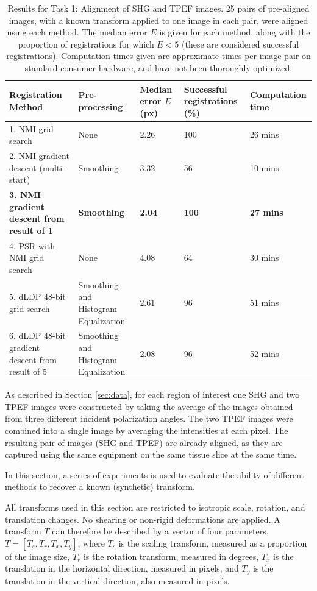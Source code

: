 \documentclass{report}
\begin{document}
\begin{table}
\centering
\begin{tabular}{|p{1.2in}|p{1.05in}|p{0.6in}|p{0.9in}|p{0.9in}|}
\hline
\textbf{Registration Method} & \textbf{Pre-processing} & \textbf{Median error $E$ (px)} & \textbf{Successful registrations (\%)} & \textbf{Computation time} \\
\hline
\hline
1. NMI grid search & None & 2.26 & 100 & 26 mins \\
\hline
2. NMI gradient descent (multi-start) & Smoothing & 3.32  & 56 & 10 mins \\
\hline
\textbf{3. NMI gradient descent from result of 1} & \textbf{Smoothing} & \textbf{2.04}  & \textbf{100} & \textbf{27 mins} \\ 
\hline
4. PSR with NMI grid search & None & 4.08 & 64 & 30 mins \\
\hline
5. dLDP 48-bit grid search & Smoothing and Histogram Equalization & 2.61 & 96 & 51 mins \\
\hline
6. dLDP 48-bit gradient descent from result of 5 & Smoothing and Histogram Equalization & 2.08  & 96 & 52 mins \\
\hline
\end{tabular}
\caption{Results for Task 1: Alignment of SHG and TPEF images. 25 pairs of pre-aligned images, with a known transform applied to one image in each pair, were aligned using each method. The median error $E$ is given for each method, along with the proportion of registrations for which $E<5$ (these are considered successful registrations). Computation times given are approximate times per image pair on standard consumer hardware, and have not been thoroughly optimized.}
\label{tab:task1results}
\end{table}


As described in Section \ref{sec:data}, for each region of interest one SHG and two TPEF images were constructed by taking the average of the images obtained from three different incident polarization angles. The two TPEF images were combined into a single image by averaging the intensities at each pixel. The resulting pair of images (SHG and TPEF) are already aligned, as they are captured using the same equipment on the same tissue slice at the same time.

In this section, a series of experiments is used to evaluate the ability of different methods to recover a known (synthetic) transform.

All transforms used in this section are restricted to isotropic scale, rotation, and translation changes. No shearing or non-rigid deformations are applied. A transform $T$ can therefore be described by a vector of four parameters, $T=[T_s, T_r, T_x, T_y]$, where $T_s$ is the scaling transform, measured as a proportion of the image size, $T_r$ is the rotation transform, measured in degrees, $T_x$ is the translation in the horizontal direction, measured in pixels, and $T_y$ is the translation in the vertical direction, also measured in pixels.
\end{document}
